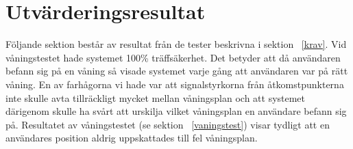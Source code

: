 \documentclass[a4paper,12pt]{article}
\begin{document}

 \section{Utvärderingsresultat}\label{utvarderingsresultat}

 Följande sektion består av resultat från de tester beskrivna i sektion ~\ref{krav}. Vid våningstestet hade systemet 100\% träffsäkerhet. Det betyder att då användaren befann sig på en våning så visade systemet varje gång att användaren var på rätt våning. En av farhågorna vi hade var att signalstyrkorna från åtkomstpunkterna inte skulle avta tillräckligt mycket mellan våningsplan och att systemet därigenom skulle ha svårt att urskilja vilket våningsplan en användare befann sig på. Resultatet av våningstestet (se sektion ~\ref{vaningstest}) visar tydligt att en användares position aldrig uppskattades till fel våningsplan.
\end{document}
